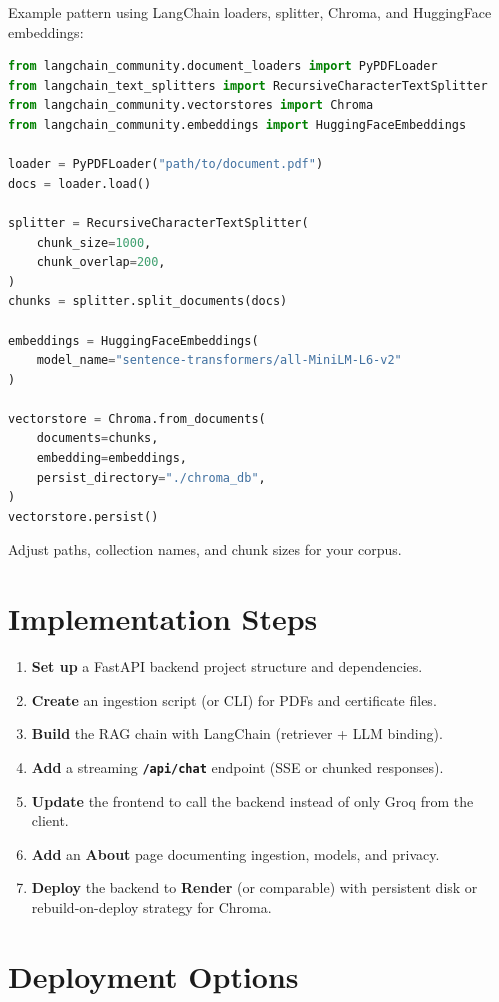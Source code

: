 \documentclass{article}
\begin{document}
Example pattern using LangChain loaders, splitter, Chroma, and HuggingFace embeddings:

\begin{lstlisting}[language=Python]
from langchain_community.document_loaders import PyPDFLoader
from langchain_text_splitters import RecursiveCharacterTextSplitter
from langchain_community.vectorstores import Chroma
from langchain_community.embeddings import HuggingFaceEmbeddings

loader = PyPDFLoader("path/to/document.pdf")
docs = loader.load()

splitter = RecursiveCharacterTextSplitter(
    chunk_size=1000,
    chunk_overlap=200,
)
chunks = splitter.split_documents(docs)

embeddings = HuggingFaceEmbeddings(
    model_name="sentence-transformers/all-MiniLM-L6-v2"
)

vectorstore = Chroma.from_documents(
    documents=chunks,
    embedding=embeddings,
    persist_directory="./chroma_db",
)
vectorstore.persist()
\end{lstlisting}

Adjust paths, collection names, and chunk sizes for your corpus.

\section{Implementation Steps}

\begin{enumerate}[leftmargin=*]
  \item \textbf{Set up} a FastAPI backend project structure and dependencies.
  \item \textbf{Create} an ingestion script (or CLI) for PDFs and certificate files.
  \item \textbf{Build} the RAG chain with LangChain (retriever + LLM binding).
  \item \textbf{Add} a streaming \textbf{\texttt{/api/chat}} endpoint (SSE or chunked responses).
  \item \textbf{Update} the frontend to call the backend instead of only Groq from the client.
  \item \textbf{Add} an \textbf{About} page documenting ingestion, models, and privacy.
  \item \textbf{Deploy} the backend to \textbf{Render} (or comparable) with persistent disk or rebuild-on-deploy strategy for Chroma.
\end{enumerate}

\section{Deployment Options}
\end{document}
